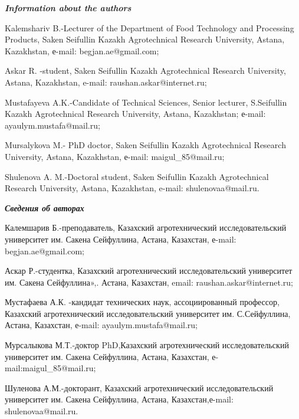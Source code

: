 \begin{info}
\hspace{1em}\emph{{\bfseries Information about the authors}}

Kalemshariv B.-Lecturer of the Department of Food Technology and
Processing Products, Saken Seifullin Kazakh Agrotechnical Research
University, Astana, Kazakhstan, е-mail: begjan.ae@gmail.com;

Askar R. -student, Saken Seifullin Kazakh Agrotechnical Research
University, Astana, Kazakhstan, e-mail: raushan.askar@internet.ru;

Mustafayeva A.K.-Candidate of Technical Sciences, Senior lecturer,
S.Seifullin Kazakh Agrotechnical Research University, Astana,
Kazakhstan; е-mail: ayaulym.mustafa@mail.ru;

Mursalykova M.- PhD doctor, Saken Seifullin Kazakh Agrotechnical
Research University, Astana, Kazakhstan, е-mail: maigul\_85@mail.ru;

Shulenova A. M.-Doctoral student, Saken Seifullin Kazakh Agrotechnical
Research University, Astana, Kazakhstan, e-mail: shulenovaa@mail.ru.

\hspace{1em}\emph{{\bfseries Сведения об авторах}}

Калемшарив Б.-преподаватель, Казахский агротехнический
исследовательский университет им. Сакена Сейфуллина, Астана,
Казахстан, е-mail: begjan.ae@gmail.com;

Аскар Р.-студентка, Казахский агротехнический исследовательский
университет им. Сакена Сейфуллина»,. Астана, Казахстан, email:
raushan.askar@internet.ru;

Мустафаева А.К. -кандидат технических наук, ассоциированный профессор,
Казахский агротехнический исследовательский университет им.
С.Сейфуллина, Астана, Казахстан, е-mail: ayaulym.mustafa@mail.ru;

Мурсалыкова М.Т.-доктор PhD,Казахский агротехнический
исследовательский университет им. Сакена Сейфуллина, Астана,
Казахстан, е-mail:maigul\_85@mail.ru;

Шуленова А.М.-докторант, Казахский агротехнический исследовательский
университет им. Сакена Сейфуллина, Астана, Казахстан,е-mail:
shulenovaa@mail.ru.
\end{info}
